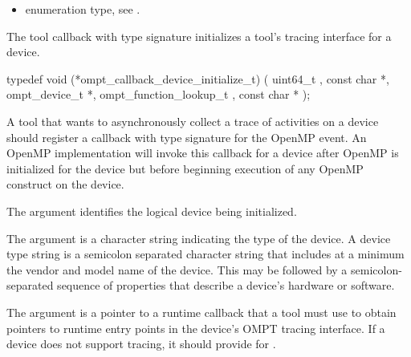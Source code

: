 \codeptrdesc

\crossreferences
\begin{itemize}
\item {} enumeration type, see .
\end{itemize}


\label{sec:ompt_callback_device_initialize_t}

\summary The tool callback with type signature
 initializes a
tool's tracing interface for a device.

\format

\begin{ccppspecific}
\begin{omptCallback}
typedef void (*ompt_callback_device_initialize_t) (
  uint64_t ,
  const char *,
  ompt_device_t *,
  ompt_function_lookup_t ,
  const char *
);
\end{omptCallback}
\end{ccppspecific}


\descr

A tool that wants to asynchronously collect a trace of
activities on a device should register a callback with type signature
 for the
 OpenMP event. An OpenMP
implementation will invoke this callback for a device after OpenMP is
initialized for the device but before beginning execution of any
OpenMP construct on the device.

\argdesc

The argument  identifies the logical device
being initialized.

The argument  is a character string indicating the
type of the device. A device type string is a semicolon separated
character string that includes at a minimum the vendor and model name
of the device. This may be followed by a semicolon-separated sequence
of properties that describe a device's hardware or software.

\devicedesc

The argument  is a pointer to a runtime callback
that a tool must use to obtain pointers to runtime entry points in the
device's OMPT tracing interface. If a device does not support tracing,
it should provide  for .

